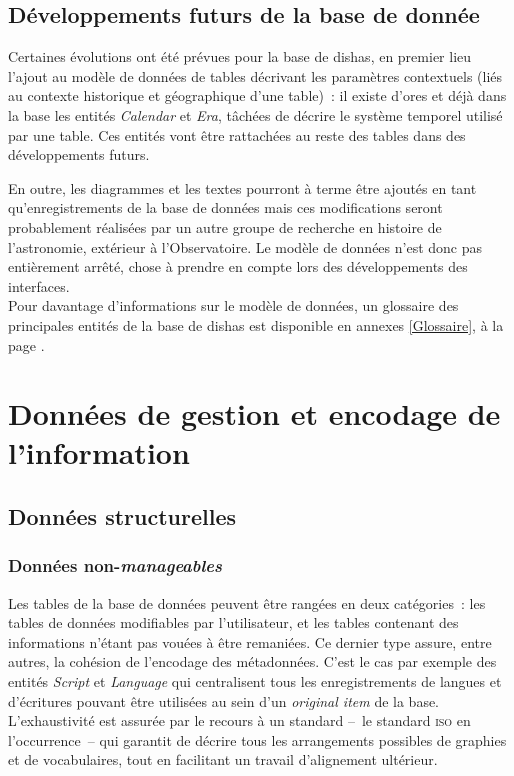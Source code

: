 \documentclass[a4paper,12pt,twoside]{book}
\newcommand{\eng}{\emph}
\newcommand{\oi}{\eng{original item}\xspace}
\newcommand{\dishas}{\gls{dishas}\xspace}
\begin{document}
		\subsection{Développements futurs de la base de donnée}
Certaines évolutions ont été prévues pour la base de \dishas, en premier lieu l'ajout au modèle de données de tables décrivant les paramètres contextuels (liés au contexte historique et géographique d'une table)~: il existe d'ores et déjà dans la base les entités \eng{Calendar} et \eng{Era}, tâchées de décrire le système temporel utilisé par une table. Ces entités vont être rattachées au reste des tables dans des développements futurs.

En outre, les diagrammes et les textes pourront à terme être ajoutés en tant qu'enregistrements de la base de données mais ces modifications seront probablement réalisées par un autre groupe de recherche en histoire de l'astronomie, extérieur à l'Observatoire. Le modèle de données n'est donc pas entièrement arrêté, chose à prendre en compte lors des développements des interfaces.\\

Pour davantage d'informations sur le modèle de données, un glossaire des principales entités de la base de \dishas est disponible en annexes \ref{Glossaire}, à la page \pageref{Glossaire}.

	\section{Données de gestion et encodage de l'information}
		\subsection{Données structurelles}
			\subsubsection{Données non-\emph{manageables}}
Les tables de la base de données peuvent être rangées en deux catégories~: les tables de données modifiables par l'utilisateur, et les tables contenant des informations n'étant pas vouées à être remaniées. Ce dernier type assure, entre autres, la cohésion de l'encodage des métadonnées. C'est le cas par exemple des entités \eng{Script} et \eng{Language} qui centralisent tous les enregistrements de langues et d'écritures pouvant être utilisées au sein d'un \oi de la base. L'exhaustivité est assurée par le recours à un standard –~le standard \textsc{iso} en l'occurrence~– qui garantit de décrire tous les arrangements possibles de graphies et de vocabulaires, tout en facilitant un travail d'alignement ultérieur.
\end{document}
